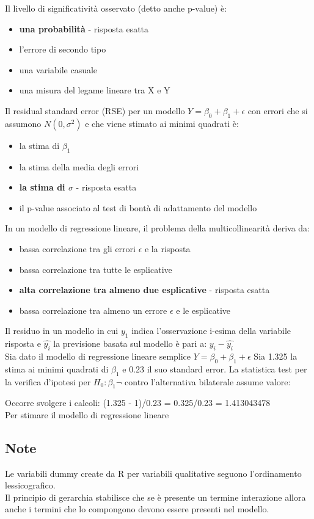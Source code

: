 Il livello di significatività osservato (detto anche p-value) è:

\begin{itemize}
\item \textbf{una probabilità} - risposta esatta
\item l'errore di secondo tipo
\item una variabile casuale
\item una misura del legame lineare tra X e Y
\end{itemize}

Il residual standard error (RSE) per un modello $Y = \beta_0 + \beta_1 + \epsilon$
con errori che si assumono $N(0,\sigma^2)$ e che viene stimato ai minimi quadrati è:

\begin{itemize}
\item la stima di $\beta_1$
\item la stima della media degli errori
\item \textbf{la stima di $\sigma$} - risposta esatta
\item il p-value associato al test di bontà di adattamento del modello
\end{itemize}

In un modello di regressione lineare, il problema della multicollinearità deriva da:

\begin{itemize}
\item bassa correlazione tra gli errori $\epsilon$ e la risposta
\item bassa correlazione tra tutte le esplicative
\item \textbf{alta correlazione tra almeno due esplicative} - risposta esatta
\item bassa correlazione tra almeno un errore $\epsilon$ e le esplicative
\end{itemize}

Il residuo in un modello in cui $y_1$ indica l’osservazione i-esima della variabile
risposta e $\hat{y_i}$ la previsione basata sul modello è pari a: $y_i - \hat{y_i}$\\

Sia dato il modello di regressione lineare semplice $Y = \beta_0 + \beta_1 + \epsilon$
Sia 1.325 la stima ai minimi quadrati di $\beta_1$ e 0.23 il suo standard error. 
La statistica test per la verifica d'ipotesi per $H_0 : \beta_1 \neg$ contro
l'alternativa bilaterale assume valore:

Occorre svolgere i calcoli: (1.325 - 1)/0.23 = 0.325/0.23 = 1.413043478\\

Per stimare il modello di regressione lineare

\subsection{Note}

Le variabili dummy create da R per variabili qualitative seguono l'ordinamento lessicografico.\\

Il principio di gerarchia stabilisce che se è presente un termine interazione allora anche i termini
che lo compongono devono essere presenti nel modello.
